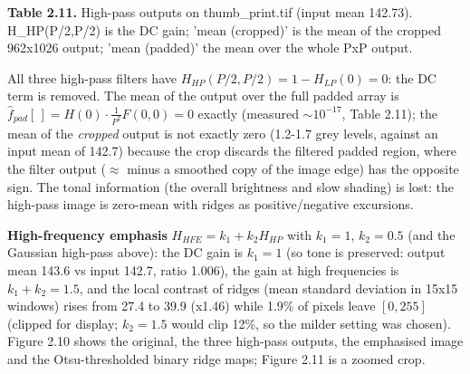 \documentclass[10pt,a4paper]{article}
\begin{document}
\begin{table}[H]\centering\footnotesize{\small\textbf{Table 2.11.} High-pass outputs on thumb\_print.tif (input mean 142.73). H\_HP(P/2,P/2) is the DC gain; 'mean (cropped)' is the mean of the cropped 962x1026 output; 'mean (padded)' the mean over the whole PxP output.\par}\vskip 3pt
\end{table}
All three high-pass filters have $H_{HP}(P/2,P/2)=1-H_{LP}(0)=0$: the DC term is removed. The mean of the output over the full padded array is $\hat f_{pad}[\,]=H(0)\cdot\frac1{P^2}F(0,0)=0$ exactly (measured $\sim10^{-17}$, Table 2.11); the mean of the \textit{cropped} output is not exactly zero (1.2-1.7 grey levels, against an input mean of 142.7) because the crop discards the filtered padded region, where the filter output ($\approx$ minus a smoothed copy of the image edge) has the opposite sign. The tonal information (the overall brightness and slow shading) is lost: the high-pass image is zero-mean with ridges as positive/negative excursions.

\textbf{High-frequency emphasis} $H_{HFE}=k_1+k_2H_{HP}$ with $k_1=1$, $k_2=0.5$ (and the Gaussian high-pass above): the DC gain is $k_1=1$ (so tone is preserved: output mean 143.6 vs input 142.7, ratio 1.006), the gain at high frequencies is $k_1+k_2=1.5$, and the local contrast of ridges (mean standard deviation in 15x15 windows) rises from 27.4 to 39.9 (x1.46) while 1.9\% of pixels leave $[0,255]$ (clipped for display; $k_2=1.5$ would clip 12\%, so the milder setting was chosen). Figure 2.10 shows the original, the three high-pass outputs, the emphasised image and the Otsu-thresholded binary ridge maps; Figure 2.11 is a zoomed crop.
\end{document}
